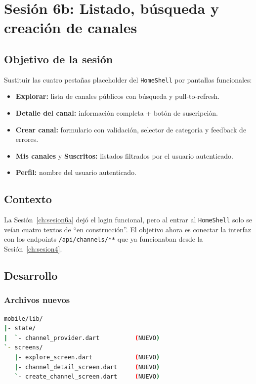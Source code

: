 \chapter{Sesión 6b: Listado, búsqueda y creación de canales}
\label{ch:sesion6b}

\section{Objetivo de la sesión}

Sustituir las cuatro pestañas placeholder del \texttt{HomeShell} por pantallas funcionales:

\begin{itemize}[leftmargin=*]
  \item \textbf{Explorar:} lista de canales públicos con búsqueda y pull-to-refresh.
  \item \textbf{Detalle del canal:} información completa + botón de suscripción.
  \item \textbf{Crear canal:} formulario con validación, selector de categoría y feedback de errores.
  \item \textbf{Mis canales} y \textbf{Suscritos:} listados filtrados por el usuario autenticado.
  \item \textbf{Perfil:} nombre del usuario autenticado.
\end{itemize}

\section{Contexto}

La Sesión~\ref{ch:sesion6a} dejó el login funcional, pero al entrar al \texttt{HomeShell} solo se veían cuatro textos de ``en construcción''. El objetivo ahora es conectar la interfaz con los endpoints \texttt{/api/channels/**} que ya funcionaban desde la Sesión~\ref{ch:sesion4}.

\section{Desarrollo}

\subsection{Archivos nuevos}

\begin{lstlisting}[language=bash]
mobile/lib/
|- state/
|  `- channel_provider.dart          (NUEVO)
`- screens/
   |- explore_screen.dart            (NUEVO)
   |- channel_detail_screen.dart     (NUEVO)
   `- create_channel_screen.dart     (NUEVO)
\end{lstlisting}

